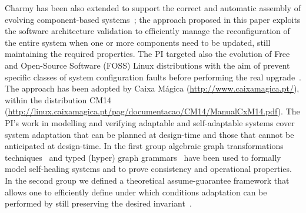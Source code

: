 \documentclass[12pt]{article}
\begin{document}
Charmy has been also extended to support the correct and automatic assembly of evolving component-based systems~\cite{Pelliccione20082237}; the approach proposed in this paper exploits the software architecture validation to efficiently manage the reconfiguration of the entire system when one or more components need to be updated, still maintaining the required properties. The PI targeted also the evolution of Free and Open-Source Software (FOSS) Linux distributions with the aim of prevent specific classes of system configuration faults before performing the real upgrade~\cite{DiCosmo2011,DiRuscio2014,DiRuscio2015}. %
The %
approach has been adopted by Caixa M\'agica ({\small \url{http://www.caixamagica.pt/}}), within the distribution CM14 ({\small \url{http://linux.caixamagica.pt/pag/documentacao/CM14/ManualCxM14.pdf}}).
The PI's work in modelling and verifying adaptable and self-adaptable systems cover system adaptation that can be planned at design-time and those that cannot be anticipated at design-time. In the first group algebraic graph transformations techniques~\cite{WICSA2009} and typed (hyper) graph grammars~\cite{Bucchiarone2015,Ehrig2010} have been used to formally model self-healing systems and to prove consistency and operational properties. In the second group we defined a theoretical assume-guarantee framework that allows one to efficiently define under which conditions adaptation can be performed by still preserving the desired invariant~\cite{IPT09}. 
\end{document}
